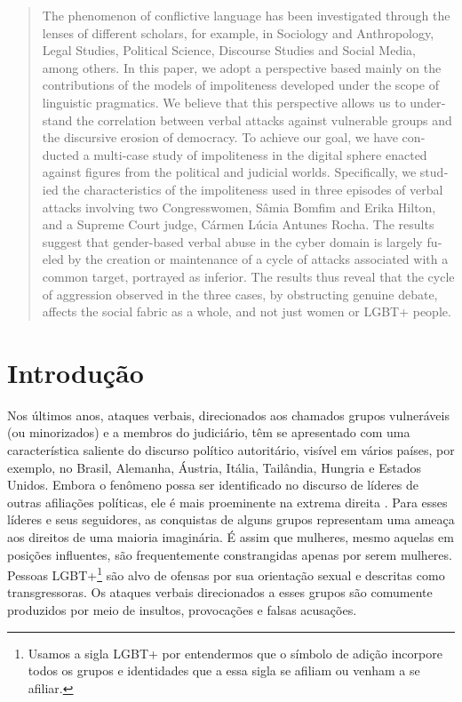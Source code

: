 \documentclass[portuguese]{textolivre}
\begin{document}
\begin{polyabstract}
\begin{english}
\begin{abstract}
The phenomenon of conflictive language has been investigated through the lenses of different scholars, for example, in Sociology and Anthropology, Legal Studies, Political Science, Discourse Studies and Social Media, among others. In this paper, we adopt a perspective based mainly on the contributions of the models of impoliteness developed under the scope of linguistic pragmatics. We believe that this perspective allows us to understand the correlation between verbal attacks against vulnerable groups and the discursive erosion of democracy. To achieve our goal, we have conducted a multi-case study of impoliteness in the digital sphere enacted against figures from the political and judicial worlds. Specifically, we studied the characteristics of the impoliteness used in three episodes of verbal attacks involving two Congresswomen, Sâmia Bomfim and Erika Hilton, and a Supreme Court judge, Cármen Lúcia Antunes Rocha. The results suggest that gender-based verbal abuse in the cyber domain is largely fueled by the creation or maintenance of a cycle of attacks associated with a common target, portrayed as inferior. The results thus reveal that the cycle of aggression observed in the three cases, by obstructing genuine debate, affects the social fabric as a whole, and not just women or LGBT+ people.

\end{abstract}
\end{english}
\end{polyabstract}

\section{Introdução}\label{sec-intro}
Nos últimos anos, ataques verbais, direcionados aos chamados grupos vulneráveis (ou minorizados) e a membros do judiciário, têm se apresentado com uma característica saliente do discurso político autoritário, visível em vários países, por exemplo, no Brasil, Alemanha, Áustria, Itália, Tailândia, Hungria e Estados Unidos. Embora o fenômeno possa ser identificado no discurso de líderes de outras afiliações políticas, ele é mais proeminente na extrema direita \cite{drinoczi-agnieska2022}. Para esses líderes e seus seguidores, as conquistas de alguns grupos representam uma ameaça aos direitos de uma maioria imaginária. É assim que mulheres, mesmo aquelas em posições influentes, são frequentemente constrangidas apenas por serem mulheres. Pessoas LGBT+\footnote{Usamos a sigla LGBT+ por entendermos que o símbolo de adição incorpore todos os grupos e identidades que a essa sigla se afiliam ou venham a se afiliar.} são alvo de ofensas por sua orientação sexual e descritas como transgressoras. Os ataques verbais direcionados a esses grupos são comumente produzidos por meio de insultos, provocações e falsas acusações.
\end{document}
